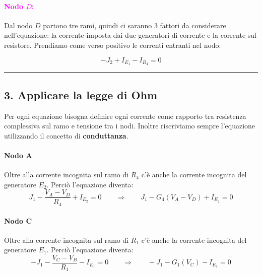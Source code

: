 \paragraph{\textcolor{magenta}{\textbf{Nodo $D$:}}}
\begin{minipage}[t]{0.6\textwidth}
\vspace{0pt}
Dal nodo $D$ partono tre rami, quindi ci saranno 3 fattori da considerare nell'equazione: la corrente imposta dai due generatori di corrente e la corrente sul resistore. Prendiamo come verso positivo le correnti entranti nel nodo:

\begin{equation}
        - J_2 + I_{E_1} - I_{R_4} = 0
        \label{eq:nodoD_vincolo}
\end{equation}
\end{minipage}
\hfill
\begin{minipage}[t]{0.3\textwidth}
\vspace{0pt}
\centering
{}
\end{minipage}


\vspace*{0.3cm}
\hrule

\subsection*{3. Applicare la legge di Ohm}
Per ogni equazione bisogna definire ogni corrente come rapporto tra resistenza complessiva sul ramo e tensione tra i nodi. Inoltre riscriviamo sempre l'equazione utilizzando il concetto di \textbf{conduttanza}.

\paragraph{Nodo A}
Oltre alla corrente incognita sul ramo di $R_4$ c'è anche la corrente incognita del generatore $E_2$. Perciò l'equazione diventa:
\begin{equation}
J_1 - \frac{V_A - V_D}{R_4} + I_{E_2}= 0 \qquad \Rightarrow \qquad J_1 - G_4\left(V_A - V_D\right) + I_{E_2}= 0
\label{eq:nodoA_Ohm_E}
\end{equation}

\paragraph{Nodo C}
Oltre alla corrente incognita sul ramo di $R_1$ c'è anche la corrente incognita del generatore $E_1$. Perciò l'equazione diventa:
\begin{equation}
- J_1 - \frac{V_C - V_B}{R_1} - I_{E_1} = 0 \qquad \Rightarrow \qquad - J_1 - G_1\left(V_C\right) - I_{E_1}= 0
\label{eq:nodoC_Ohm_E}
\end{equation}


